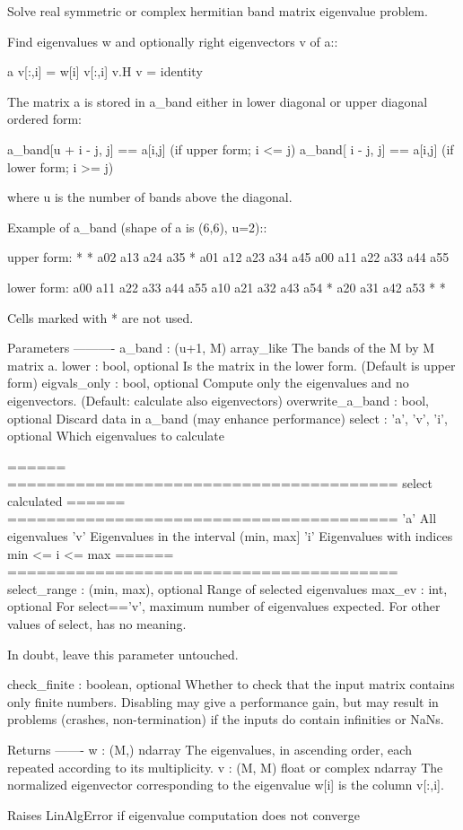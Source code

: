 \begin{DoxyVerb}Solve real symmetric or complex hermitian band matrix eigenvalue problem.

Find eigenvalues w and optionally right eigenvectors v of a::

    a v[:,i] = w[i] v[:,i]
    v.H v    = identity

The matrix a is stored in a_band either in lower diagonal or upper
diagonal ordered form:

    a_band[u + i - j, j] == a[i,j]        (if upper form; i <= j)
    a_band[    i - j, j] == a[i,j]        (if lower form; i >= j)

where u is the number of bands above the diagonal.

Example of a_band (shape of a is (6,6), u=2)::

    upper form:
    *   *   a02 a13 a24 a35
    *   a01 a12 a23 a34 a45
    a00 a11 a22 a33 a44 a55

    lower form:
    a00 a11 a22 a33 a44 a55
    a10 a21 a32 a43 a54 *
    a20 a31 a42 a53 *   *

Cells marked with * are not used.

Parameters
----------
a_band : (u+1, M) array_like
    The bands of the M by M matrix a.
lower : bool, optional
    Is the matrix in the lower form. (Default is upper form)
eigvals_only : bool, optional
    Compute only the eigenvalues and no eigenvectors.
    (Default: calculate also eigenvectors)
overwrite_a_band : bool, optional
    Discard data in a_band (may enhance performance)
select : {'a', 'v', 'i'}, optional
    Which eigenvalues to calculate

    ======  ========================================
    select  calculated
    ======  ========================================
    'a'     All eigenvalues
    'v'     Eigenvalues in the interval (min, max]
    'i'     Eigenvalues with indices min <= i <= max
    ======  ========================================
select_range : (min, max), optional
    Range of selected eigenvalues
max_ev : int, optional
    For select=='v', maximum number of eigenvalues expected.
    For other values of select, has no meaning.

    In doubt, leave this parameter untouched.

check_finite : boolean, optional
    Whether to check that the input matrix contains only finite numbers.
    Disabling may give a performance gain, but may result in problems
    (crashes, non-termination) if the inputs do contain infinities or NaNs.

Returns
-------
w : (M,) ndarray
    The eigenvalues, in ascending order, each repeated according to its
    multiplicity.
v : (M, M) float or complex ndarray
    The normalized eigenvector corresponding to the eigenvalue w[i] is
    the column v[:,i].

Raises LinAlgError if eigenvalue computation does not converge\end{DoxyVerb}
 \hypertarget{namespacescipy_1_1linalg_1_1decomp_af1e11b6ecf545c4c3b2b7c832bb02393}{}
